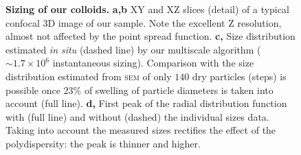 \begin{figure}
	\caption{\textbf{Sizing of our colloids.} \textbf{a,b} XY and XZ slices (detail) of a typical confocal 3D image of our sample. Note the excellent Z resolution, almost not affected by the point spread function. \textbf{c,} Size distribution estimated \emph{in situ} (dashed line) by our multiscale algorithm ($\sim 1.7\times 10^6$ instantaneous sizing). Comparison with the size distribution estimated from \textsc{sem} of only $140$ dry particles (steps) is possible once $23\%$ of swelling of particle diameters is taken into account (full line). \textbf{d,} First peak of the radial distribution function with (full line) and without (dashed) the individual sizes data. Taking into account the measured sizes rectifies the effect of the polydispersity: the peak is thinner and higher.}
	\label{fig:sizing}
\end{figure}
\tikzset{external/force remake=false}
